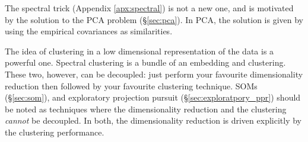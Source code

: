 The spectral trick (Appendix \ref{apx:spectral}) is not a new one, and is motivated by the solution to the PCA problem (\S\ref{sec:pca}). In PCA, the solution is given by using the empirical covariances as similarities. 

The idea of clustering in a low dimensional representation of the data is a powerful one. 
Spectral clustering is a bundle of an embedding and clustering. 
These two, however, can be decoupled: just perform your favourite dimensionality reduction then followed by your favourite clustering technique.
SOMs (\S\ref{sec:som}), and exploratory projection pursuit (\S\ref{sec:exploratpory_ppr}) should be noted as techniques where the dimensionality reduction and the clustering \emph{cannot} be decoupled. In both, the dimensionality reduction is driven explicitly by the clustering performance.  


